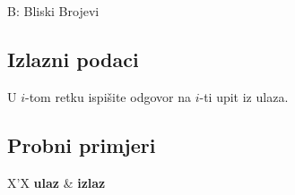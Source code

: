 \begin{statement}[
  timelimit=2 s,
  memorylimit=512 MiB,
]{B: Bliski Brojevi}
\subsection*{Izlazni podaci}
U $i$-tom retku ispišite odgovor na $i$-ti upit iz ulaza.

\subsection*{Probni primjeri}
\begin{tabularx}{\textwidth}{X'X}
  \textbf{ulaz}
  \linespread{1}{} &
  \textbf{izlaz}
  \linespread{1}{}
\end{tabularx}

\end{statement}

